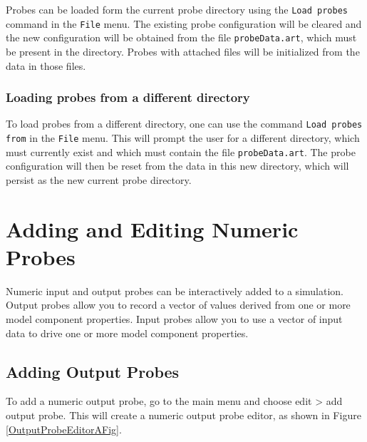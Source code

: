 \documentclass{article}
\begin{document}
Probes can be loaded form the current probe directory using the 
{\tt Load probes} command in the {\tt File} menu. The existing probe
configuration will be cleared and the new configuration will be
obtained from the file {\tt probeData.art}, which must be present in
the directory. Probes with attached files will be initialized from the
data in those files.

\subsubsection{Loading probes from a different directory}

To load probes from a different directory, one can use the command 
{\tt Load probes from} in the {\tt File} menu. This will prompt the user
for a different directory, which must currently exist and
which must contain the file {\tt probeData.art}. The probe
configuration will then be reset from the data in this new
directory, which will persist as the new current probe directory.

\section{Adding and Editing Numeric Probes}
\label{AddingAndEditingNumericProbes:sec}

Numeric input and output probes can be interactively added to a
simulation. Output probes allow you to record a vector of values
derived from one or more model component properties.  Input probes
allow you to use a vector of input data to drive one or more model
component properties.

\subsection{Adding Output Probes}

To add a numeric output probe, go to the main
menu and choose {\sf edit > add output probe}. This will create
a numeric output probe editor, as shown in Figure \ref{OutputProbeEditorAFig}.
\end{document}
